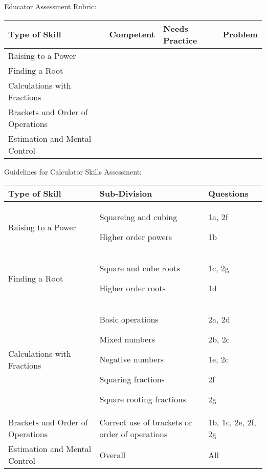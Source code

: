 Educator Assessment Rubric:
\begin{table}[H]
 \begin{center}
  \begin{tabular}{|p{4.5cm}|p{1.5cm}|p{3cm}|p{1.5cm}|} \hline

\textbf{Type of Skill} & \textbf{Competent} & \textbf{Needs Practice} & \textbf{Problem}   \\ \hline
Raising to a Power &&&\\ \hline
Finding a Root&&&\\ \hline
Calculations with Fractions&&&\\ \hline
Brackets and Order of Operations&&&\\ \hline
Estimation and Mental Control&&&\\ \hline
   
  \end{tabular}

 \end{center}

\end{table}
Guidelines for Calculator Skills Assessment:
\begin{table}[H]
 \begin{center}
  \begin{tabular}{|p{5cm}|p{4cm}|p{3cm}|} \hline

\textbf{Type of Skill} & \textbf{Sub-Division} & \textbf{Questions}   \\ \hline
Raising to a Power & Squareing and cubing\par Higher order powers&1a, 2f \par1b \\ \hline
Finding a Root&Square and cube roots \par Higher order roots & 1c, 2g \par 1d\\ \hline
Calculations with Fractions&Basic operations \par Mixed numbers \par Negative numbers \par Squaring fractions \par Square rooting fractions&2a,  2d\par
2b, 2c\par
1e, 2c\par
2f\par
2g
\\ \hline
Brackets and Order of Operations&Correct use of brackets or order of operations&1b, 1c, 2e, 2f, 2g\\ \hline
Estimation and Mental Control&Overall&All\\ \hline
   
  \end{tabular}

 \end{center}

\end{table}

